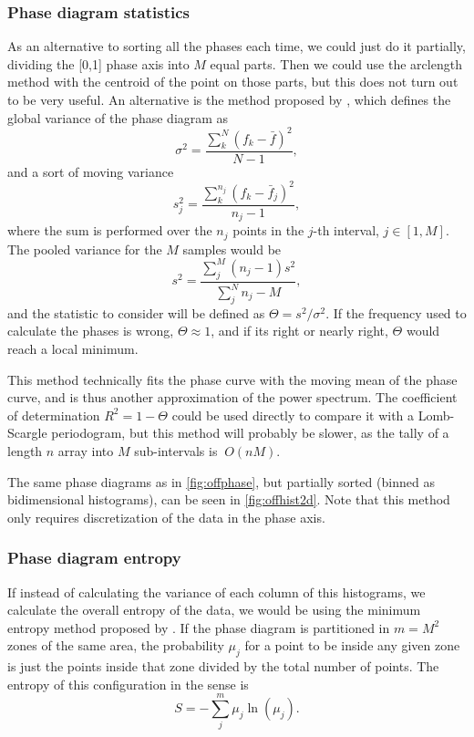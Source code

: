 	
	\subsubsection{Phase diagram statistics}
	
	As an alternative to sorting all the phases each time, we could just do it partially,
	dividing the [0,1] phase axis into $M$ equal parts. 
	Then we could use the arclength method with the centroid of the point on those parts, but this does not turn out to be very useful.
	An alternative is the method proposed by \cite{Stellingwerf1978}, which defines the global variance of the phase diagram as
	\begin{equation}
		\sigma^2 = \frac{\sum_k^N (f_k - \bar{f})^2}{N-1},
	\end{equation}
	and a sort of moving variance
	\begin{equation}
		s_j^2 = \frac{\sum_k^{n_j} (f_k-\bar{f}_j)^2}{n_j-1},
	\end{equation}
	where the sum is performed over the $n_j$ points in the $j$-th interval, $j\in[1,M]$.
	The pooled variance for the $M$ samples would be 
	\begin{equation}
		s^2 = \frac{\sum_j^M (n_j-1)s^2}{\sum_j^N n_j -M}, \label{eq:pooled-variance}
	\end{equation}
	and the statistic to consider will be defined as $\Theta=s^2/\sigma^2$. 
	If the frequency used to calculate the phases is wrong, $\Theta\approx 1$, and if its right or nearly right, 
	$\Theta$ would reach a local minimum.
	
	This method technically fits the phase curve with the moving mean of the phase curve, and is thus another approximation of the power spectrum.
	The coefficient of determination $R^2=1-\Theta$ could be used directly to compare it with a Lomb-Scargle periodogram, but this method will probably be slower,
	as the tally of a length $n$ array into $M$ sub-intervals is $~O(nM)$.
	
	The same phase diagrams as in \autoref{fig:offphase}, 
	but partially sorted (binned as bidimensional histograms), can be seen in \autoref{fig:offhist2d}.
	Note that this method only requires discretization of the data in the phase axis.
	
	
	\subsubsection{Phase diagram entropy}
	
	If instead of calculating the variance of each column of this histograms,
	we calculate the overall entropy of the data, we would be using the minimum entropy method proposed by \cite{Cincotta1995I}.
	If the phase diagram is partitioned in $m=M^2$ zones of the same area, 
	the probability $\mu_j$ for a point to be inside any given zone is just the points inside that zone divided by the total number of points.
	The entropy of this configuration in the \cite{Shannon1948} sense is 
	\begin{equation}
		S = - \sum_j^m \mu_j \ln(\mu_j). \label{eq:entropy}
	\end{equation}
	
